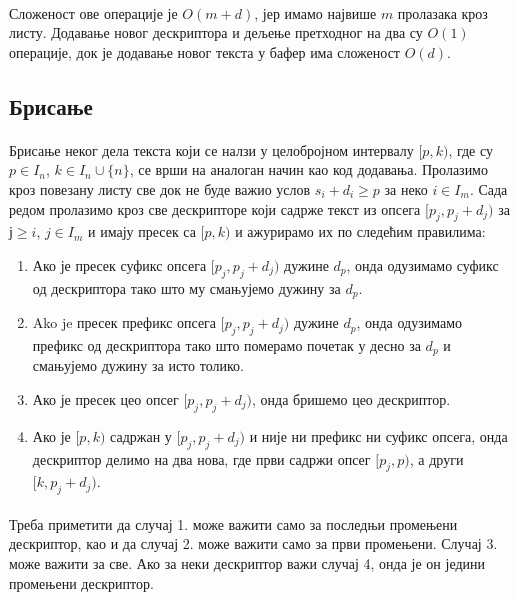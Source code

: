 \documentclass[12pt,oneside]{memoir}
\begin{document}
\paragraph{}
Сложеност ове операције је \(O(m + d)\), јер имамо највише \(m\) пролазака кроз листу.
Додавање новог дескриптора и дељење претходног на два су \(O(1)\) операције, док
је додавање новог текста у бафер има сложеност \(O(d)\).

\subsection{Брисање}
\paragraph{}
Брисање неког дела текста који се налзи у целобројном интервалу \([p, k)\), где су \(p \in I_n\), \(k \in I_n \cup \{n\}\), се врши на аналоган начин као код додавања. Пролазимо кроз повезану листу све док не буде важио
услов \(s_i + d_i \geq p\) за неко \(i \in I_m\). Сада редом пролазимо кроз све дескрипторе 
који садрже текст из опсега \([p_j, p_j+d_j)\) за \(ј \geq i\), \(j \in I_m\) и  имају пресек са
\([p, k)\) и ажурирамо их по следећим правилима:

\begin{enumerate}
	\item Ако је пресек суфикс опсега \([p_j, p_j+d_j)\) дужине \(d_p\), онда одузимамо суфикс 
	од дескриптора тако што му смањујемо дужину за \(d_p\).
	
	\item Ako je пресек префикс опсега \([p_j, p_j+d_j)\) дужине \(d_p\), онда одузимамо префикс
	 од дескриптора тако што померамо почетак у десно за \(d_p\) и смањујемо дужину за исто
	 толико.
	 
	\item Ако је пресек цео опсег \([p_j, p_j+d_j)\), онда бришемо цео дескриптор.
	 
	\item Ако је \([p, k)\) садржан у \([p_j, p_j+d_j)\) и није ни префикс ни суфикс опсега,
	онда дескриптор делимо на два нова, где први садржи опсег \([p_j, p)\), а други 
	\([k, p_j+d_j)\).
\end{enumerate}
\paragraph{}
Треба приметити да случај 1. може важити само за последњи промењени дескриптор, као и
да случај 2. може важити само за први промењени. Случај 3. може важити за све. Ако за
неки дескриптор важи случај 4, онда је он једини промењени дескриптор.
\end{document}
